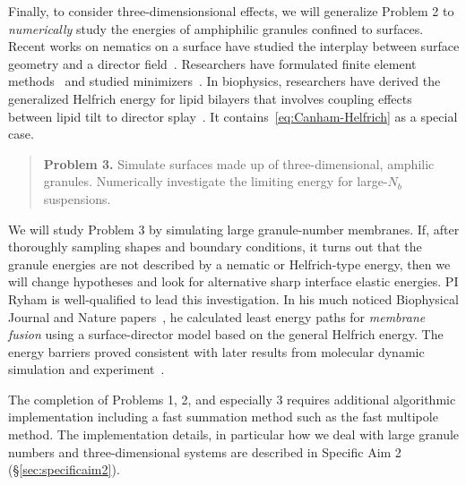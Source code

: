Finally, to consider three-dimensionsional effects, we will generalize
Problem 2 to \emph{numerically} study the energies of amphiphilic
granules confined to surfaces. Recent works on nematics on a surface have
studied the interplay between surface geometry and a director
field~\cite{Nestler2020PropertiesOS, Nitschke2018NematicLC,
Nestler2018OrientationalOO, Nitschke2019HydrodynamicII,
Nitschke2020LiquidCO}. Researchers have formulated finite element
methods~\cite{Bartels2012FiniteEM, Nochetto2015NumericsFL,
Nestler2019AFE} and studied minimizers~\cite{Segatti2014EquilibriumCO,
Segatti2014AnalysisOA}. In biophysics, researchers
have derived the generalized Helfrich energy for lipid bilayers that
involves coupling effects between lipid tilt to director
splay~\cite{Hamm2000ElasticEO, Terzi2019CurvatureTiltTO, Terzi2019ACQ,
  Terzi2017NovelTC, Pinigin2020NewCT,Rangamani20140463}. It contains~\eqref{eq:Canham-Helfrich}
as a special case.
\begin{quotation}
  \noindent
  \textbf{Problem 3.} Simulate surfaces made up of three-dimensional,
  amphilic granules. Numerically investigate the limiting energy for
  large-$N_b$ suspensions.
\end{quotation}
We will study Problem 3 by simulating large granule-number membranes.
If, after thoroughly sampling shapes and boundary conditions,
it turns out that the granule energies are not described by
a nematic or  Helfrich-type energy, then we will change
hypotheses and look for alternative sharp interface elastic energies.
PI Ryham is well-qualified to lead this investigation.
In his much noticed Biophysical Journal and Nature
papers~\cite{RyKlYaCo16, Chetal16}, he calculated least energy
paths for \emph{membrane fusion} using a surface-director model based on
the general Helfrich energy. The energy barriers 
proved consistent with later results from molecular dynamic
simulation and experiment~\cite{SmRiMu19, 2017PNAS..114.1238F}.

The completion of Problems 1, 2, and especially 3 requires additional
algorithmic implementation including a fast summation method such as the
fast multipole method. The implementation details, in particular how we
deal with large granule numbers and three-dimensional systems are
described in Specific Aim 2 (\S\ref{sec:specificaim2}).




